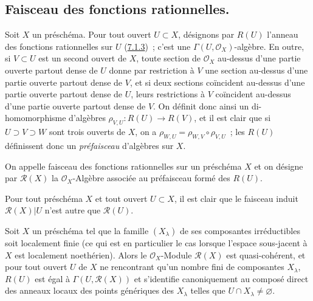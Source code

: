 \subsection{Faisceau des fonctions rationnelles.}
\label{subsection:I.7.3-fr}

\begin{env}[7.3.1]
\label{I.7.3.1-fr}
Soit $X$ un préschéma. Pour tout ouvert $U\subset X$, désignons par $R(U)$
l'anneau des fonctions rationnelles sur $U$
(\hyperref[I.7.1.3-fr]{7.1.3})~; c'est une
$\Gamma(U,\mathscr{O}_X)$-algèbre. En outre, si $V\subset U$ est un second
ouvert de $X$, toute section de $\mathscr{O}_X$ au-dessus d'une partie
ouverte partout dense de $U$ donne par restriction à $V$ une section
au-dessus d'une partie ouverte partout dense de $V$, et si deux sections
coïncident au-dessus d'une partie ouverte partout dense de $U$, leurs
restrictions à $V$ coïncident au-dessus d'une partie ouverte partout dense de
$V$. On définit donc ainsi un di-homomorphisme d'algèbres
$\rho_{V,U}:R(U)\to R(V)$, et il est clair que si $U\supset V\supset W$ sont
trois ouverts de $X$, on a
$\rho_{W,U}=\rho_{W,V}\circ\rho_{V,U}$~; les $R(U)$ définissent donc un
\emph{préfaisceau} d'algèbres sur $X$.
\end{env}

\begin{definition}[7.3.2]
\label{I.7.3.2-fr}
On appelle faisceau des fonctions rationnelles sur un préschéma $X$
et on désigne par $\mathscr{R}(X)$ la $\mathscr{O}_X$-Algèbre associée au
préfaisceau formé des $R(U)$.
\end{definition}

Pour tout préschéma $X$ et tout ouvert $U\subset X$, il est clair que le
faisceau induit $\mathscr{R}(X)|U$ n'est autre que $\mathscr{R}(U)$.

\begin{proposition}[7.3.3]
\label{I.7.3.3-fr}
Soit $X$ un préschéma tel que la famille $(X_\lambda)$ de ses composantes
irréductibles soit localement finie (ce qui est en particulier le cas lorsque
l'espace sous-jacent à $X$ est localement noethérien). Alors le
$\mathscr{O}_X$-Module $\mathscr{R}(X)$ est quasi-cohérent, et pour tout
ouvert $U$ de $X$ ne rencontrant qu'un nombre fini de composantes $X_\lambda$,
$R(U)$ est égal à $\Gamma(U,\mathscr{R}(X))$ et s'identifie canoniquement au
composé direct des anneaux locaux des points génériques des $X_\lambda$ telles
que $U\cap X_\lambda\neq\varnothing$.
\end{proposition}

